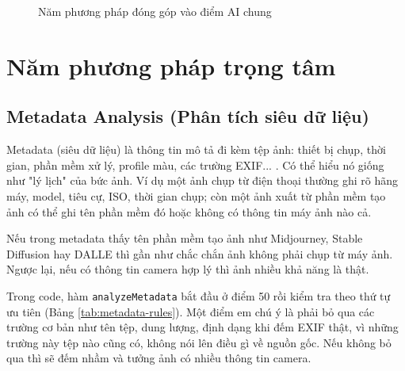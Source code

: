 \documentclass[14pt,a4paper,oneside]{report}
\begin{document}
\begin{figure}[H]
\centering
{}
\caption{Năm phương pháp đóng góp vào điểm AI chung}
\label{fig:five-methods}
\end{figure}

\section{Năm phương pháp trọng tâm}

\subsection{Metadata Analysis (Phân tích siêu dữ liệu)}
Metadata (siêu dữ liệu) là thông tin mô tả đi kèm tệp ảnh: thiết bị chụp, thời gian, phần mềm xử lý, profile màu, các trường EXIF... \cite{farid,c2pa}. Có thể hiểu nó giống như "lý lịch" của bức ảnh. Ví dụ một ảnh chụp từ điện thoại thường ghi rõ hãng máy, model, tiêu cự, ISO, thời gian chụp; còn một ảnh xuất từ phần mềm tạo ảnh có thể ghi tên phần mềm đó hoặc không có thông tin máy ảnh nào cả.

Nếu trong metadata thấy tên phần mềm tạo ảnh như Midjourney, Stable Diffusion hay DALL\textperiodcentered E thì gần như chắc chắn ảnh không phải chụp từ máy ảnh. Ngược lại, nếu có thông tin camera hợp lý thì ảnh nhiều khả năng là thật.

Trong code, hàm \texttt{analyzeMetadata} bắt đầu ở điểm 50 rồi kiểm tra theo thứ tự ưu tiên (Bảng \ref{tab:metadata-rules}). Một điểm em chú ý là phải bỏ qua các trường cơ bản như tên tệp, dung lượng, định dạng khi đếm EXIF thật, vì những trường này tệp nào cũng có, không nói lên điều gì về nguồn gốc. Nếu không bỏ qua thì sẽ đếm nhầm và tưởng ảnh có nhiều thông tin camera.
\end{document}
